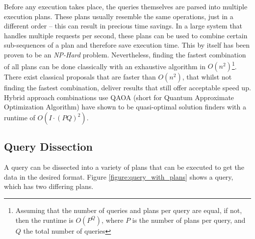 Before any execution takes place, the queries themselves are parsed into multiple execution plans\cite{microsoft_execution_nodate}. These plans usually resemble the same operations, just in a different order – this can result in precious time savings. In a large system that handles multiple requests per second, these plans can be used to combine certain sub-sequences of a plan and therefore save execution time\cite{roy_multi-query_2009}. This by itself has been proven to be an \emph{NP-Hard} problem\cite{}. Nevertheless, finding the fastest combination of all plans can be done classically with an exhaustive algorithm in $O(n^2)$\footnote{Assuming that the number of queries and plans per query are equal, if not, then the runtime is $O(P^Q)$, where $P$ is the number of plans per query, and $Q$ the total number of queries}. There exist classical proposals that are faster than $O(n^2)$\cite{}, that whilst not finding the fastest combination, deliver results that still offer acceptable speed up. Hybrid approach combinations use QAOA (short for Quantum Approximate Optimization Algorithm)\cite{} have shown to be quasi-optimal solution finders with a runtime of $O(I \cdot (PQ)^2)$.\par

\subsection{Query Dissection}
A query can be dissected into a variety of plans that can be executed to get the data in the desired format. Figure \ref{figure:query_with_plans} shows a query, which has two differing plans.

